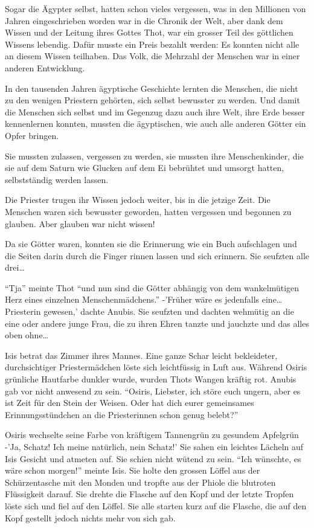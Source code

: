 \documentclass[11pt,titlepage,a5paper]{book}
\begin{document}
Sogar die Ägypter selbst, hatten schon vieles vergessen, was in den Millionen von Jahren eingeschrieben worden war in die Chronik der Welt, aber dank dem Wissen und der Leitung ihres Gottes Thot, war ein grosser Teil des göttlichen Wissens lebendig. Dafür musste ein Preis bezahlt werden: Es konnten nicht alle an diesem Wissen teilhaben. Das Volk, die Mehrzahl der Menschen war in einer anderen Entwicklung.

In den tausenden Jahren ägyptische Geschichte lernten die Menschen, die nicht zu den wenigen Priestern gehörten, sich selbst bewusster zu werden. Und damit die Menschen sich selbst und im Gegenzug dazu auch ihre Welt, ihre Erde besser kennenlernen konnten, mussten die ägyptischen, wie auch alle anderen Götter ein Opfer bringen.

Sie mussten zulassen, vergessen zu werden, sie mussten ihre Menschenkinder, die sie auf dem Saturn wie Glucken auf dem Ei bebrühtet und umsorgt hatten, selbstständig werden lassen.

Die Priester trugen ihr Wissen jedoch weiter, bis in die jetzige Zeit. Die Menschen waren sich bewusster geworden, hatten vergessen und begonnen zu glauben. Aber glauben war nicht wissen!

Da sie Götter waren, konnten sie die Erinnerung wie ein Buch aufschlagen und die Seiten darin durch die Finger rinnen lassen und sich erinnern. Sie seufzten alle drei\dots 

"`Tja"' meinte Thot "`und nun sind die Götter abhängig von dem wankelmütigen Herz eines einzelnen Menschenmädchens."' -'Früher wäre es jedenfalls eine\dots Priesterin gewesen,' dachte Anubis. Sie seufzten und dachten wehmütig an die eine oder andere junge Frau, die zu ihren Ehren tanzte und jauchzte und das alles oben ohne\dots

Isis betrat das Zimmer ihres Mannes. Eine ganze Schar leicht bekleideter, durchsichtiger Priestermädchen löste sich leichtfüssig in Luft aus. Während Osiris grünliche Hautfarbe dunkler wurde, wurden Thots Wangen kräftig rot. Anubis gab vor nicht anwesend zu sein. "`Osiris, Liebster, ich störe euch ungern, aber es ist Zeit für den Stein der Weisen. Oder hat dich eurer gemeinsames Erinnungsstündchen an die Priesterinnen schon genug belebt?"' 

Osiris wechselte seine Farbe von kräftigem Tannengrün zu gesundem Apfelgrün -'Ja, Schatz! Ich meine natürlich, nein Schatz!' Sie sahen ein leichtes Lächeln auf Isis Gesicht und atmeten auf. Sie schien nicht wütend zu sein. "`Ich wünschte, es wäre schon morgen!"' meinte Isis. Sie holte den grossen Löffel aus der Schürzentasche mit den Monden und tropfte aus der Phiole die blutroten Flüssigkeit darauf. Sie drehte die Flasche auf den Kopf und der letzte Tropfen löste sich und fiel auf den Löffel. Sie alle starten kurz auf die Flasche, die auf den Kopf gestellt jedoch nichts mehr von sich gab.
\end{document}
